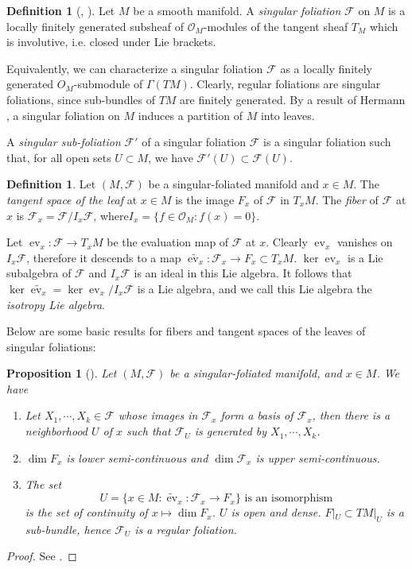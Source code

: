 \documentclass[12pt]{amsart}
\newtheorem{prop}[thm]{Proposition}
\theoremstyle{definition}
\newtheorem{defn}[thm]{Definition}
\theoremstyle{remark}
\numberwithin{equation}{section}
\newcommand{\CF}{{\mathcal F}}
\newcommand{\CO}{{\mathcal O}}
\newcommand{\1}{{\mathbb{1}}}
\newcommand{\ev}{\operatorname{ev}}
\begin{document}
\begin{defn}[\cite{AC09}, \cite{LLS20}]
	Let $M$ be a smooth manifold. A {\it singular foliation} $\CF$ on $M$ is a locally finitely generated subsheaf of $\CO_M$-modules of the tangent sheaf $T_M$ which is involutive, i.e. closed under Lie brackets.
\end{defn}
Equivalently, we can characterize a singular foliation $\CF$ as a locally finitely generated $O_M$-submodule of $\Gamma(TM)$. Clearly, regular foliations are singular foliations, since sub-bundles of $TM$ are finitely generated. By a result of Hermann \cite{Her60}, a singular foliation  on $M$ induces a partition of $M$ into leaves. 


A {\it singular sub-foliation} $\CF'$ of a singular foliation $\CF$ is a singular foliation such that, for all open sets $U\subset M$, we have $\CF'(U) \subset \CF(U)$. 

\begin{defn}
    Let $(M, \CF)$ be a singular-foliated manifold and $x \in M$. The {\it tangent space of the leaf} at $x\in M$ is the image $F_x$ of $\CF$ in $T_xM$. The {\it fiber} of $\CF$ at $x$ is $\CF_x = \CF / I_x \CF$, where$  I_x = \{f\in \CO_M:f(x) = 0\}$.
\end{defn}
Let $\ev_x:\CF \to T_x M$ be the evaluation map of $\CF$ at $x$. Clearly $\ev_x$ vanishes on $I_x \CF$, therefore it descends to a map $\tilde{\ev_x}: \CF_x \to F_x \subset T_x M$. $\ker {\ev_x}$ is a Lie subalgebra of $\CF$ and $I_x \CF$ is an ideal in this Lie algebra. It follows that $\ker \tilde{\ev_x} = \ker {\ev_x}/ I_x \CF$ is a Lie algebra, and we call this Lie algebra the {\it isotropy Lie algebra}.

Below are some basic results for fibers and tangent spaces of the leaves of singular foliations:
\begin{prop}[\cite{AS06}]
Let $(M, \CF)$ be a singular-foliated manifold, and $x\in M$. We have
\begin{enumerate}
    \item Let $X_1, \cdots, X_k \in \CF$ whose images in $\CF_x$ form a basis of $\CF_x$, then there is a neighborhood $U$ of $x$ such that $\CF_U$ is generated by $X_1, \cdots, X_k$.
    \item $\dim F_x$ is lower semi-continuous and $\dim \CF_x$ is upper semi-continuous.
    \item The set 
    $$
    U = \{ x\in M: \tilde{\ev}_x:\CF_x \to F_x\}\text{ is an isomorphism}
    $$
    is the set of continuity of $x \mapsto \dim F_x$. $U$ is open and dense. $F|_U\subset TM|_U$ is a sub-bundle, hence $\CF_U$ is a regular foliation.
\end{enumerate}
\end{prop}
\begin{proof}
    See \cite[Proposition 1.5]{AS06}.
\end{proof}
\end{document}

